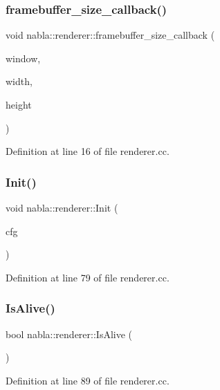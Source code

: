 \subsubsection{\texorpdfstring{framebuffer\_size\_callback()}{framebuffer\_size\_callback()}}
{\footnotesize\ttfamily void nabla\+::renderer\+::framebuffer\+\_\+size\+\_\+callback (\begin{DoxyParamCaption}\item[{G\+L\+F\+Wwindow $\ast$}]{window,  }\item[{int}]{width,  }\item[{int}]{height }\end{DoxyParamCaption})}



Definition at line 16 of file renderer.\+cc.

\mbox{\label{namespacenabla_1_1renderer_a1d6afb5e4e6c8a114a419ccb7a435fd9}} 
\subsubsection{\texorpdfstring{Init()}{Init()}}
{\footnotesize\ttfamily void nabla\+::renderer\+::\+Init (\begin{DoxyParamCaption}\item[{const \mbox{\hyperlink{structnabla_1_1renderer_1_1_init_config}{Init\+Config}} \&}]{cfg }\end{DoxyParamCaption})}



Definition at line 79 of file renderer.\+cc.

\mbox{\label{namespacenabla_1_1renderer_a132f7a0ec4097927125ceb4515026b51}} 
\subsubsection{\texorpdfstring{IsAlive()}{IsAlive()}}
{\footnotesize\ttfamily bool nabla\+::renderer\+::\+Is\+Alive (\begin{DoxyParamCaption}{ }\end{DoxyParamCaption})}



Definition at line 89 of file renderer.\+cc.


